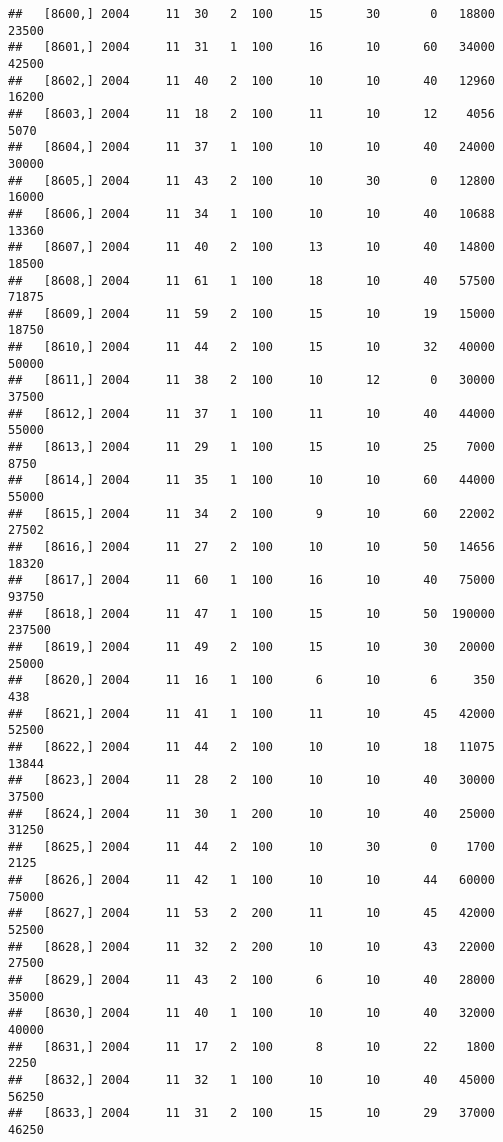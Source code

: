 \documentclass{article}\usepackage[]{graphicx}\usepackage[]{color}
\makeatletter
\newenvironment{kframe}{%
 \def\at@end@of@kframe{}%
 \ifinner\ifhmode%
  \def\at@end@of@kframe{\end{minipage}}%
  \begin{minipage}{\columnwidth}%
 \fi\fi%
 \def\FrameCommand##1{\hskip\@totalleftmargin \hskip-\fboxsep
 \colorbox{shadecolor}{##1}\hskip-\fboxsep
     \hskip-\linewidth \hskip-\@totalleftmargin \hskip\columnwidth}%
 \MakeFramed {\advance\hsize-\width
   \@totalleftmargin\z@ \linewidth\hsize
   \@setminipage}}%
 {\par\unskip\endMakeFramed%
 \at@end@of@kframe}
\newenvironment{knitrout}{}{} %
\makeatother
\begin{document}
\begin{knitrout}
\begin{kframe}
\begin{verbatim}
##   [8600,] 2004     11  30   2  100     15      30       0   18800   23500
##   [8601,] 2004     11  31   1  100     16      10      60   34000   42500
##   [8602,] 2004     11  40   2  100     10      10      40   12960   16200
##   [8603,] 2004     11  18   2  100     11      10      12    4056    5070
##   [8604,] 2004     11  37   1  100     10      10      40   24000   30000
##   [8605,] 2004     11  43   2  100     10      30       0   12800   16000
##   [8606,] 2004     11  34   1  100     10      10      40   10688   13360
##   [8607,] 2004     11  40   2  100     13      10      40   14800   18500
##   [8608,] 2004     11  61   1  100     18      10      40   57500   71875
##   [8609,] 2004     11  59   2  100     15      10      19   15000   18750
##   [8610,] 2004     11  44   2  100     15      10      32   40000   50000
##   [8611,] 2004     11  38   2  100     10      12       0   30000   37500
##   [8612,] 2004     11  37   1  100     11      10      40   44000   55000
##   [8613,] 2004     11  29   1  100     15      10      25    7000    8750
##   [8614,] 2004     11  35   1  100     10      10      60   44000   55000
##   [8615,] 2004     11  34   2  100      9      10      60   22002   27502
##   [8616,] 2004     11  27   2  100     10      10      50   14656   18320
##   [8617,] 2004     11  60   1  100     16      10      40   75000   93750
##   [8618,] 2004     11  47   1  100     15      10      50  190000  237500
##   [8619,] 2004     11  49   2  100     15      10      30   20000   25000
##   [8620,] 2004     11  16   1  100      6      10       6     350     438
##   [8621,] 2004     11  41   1  100     11      10      45   42000   52500
##   [8622,] 2004     11  44   2  100     10      10      18   11075   13844
##   [8623,] 2004     11  28   2  100     10      10      40   30000   37500
##   [8624,] 2004     11  30   1  200     10      10      40   25000   31250
##   [8625,] 2004     11  44   2  100     10      30       0    1700    2125
##   [8626,] 2004     11  42   1  100     10      10      44   60000   75000
##   [8627,] 2004     11  53   2  200     11      10      45   42000   52500
##   [8628,] 2004     11  32   2  200     10      10      43   22000   27500
##   [8629,] 2004     11  43   2  100      6      10      40   28000   35000
##   [8630,] 2004     11  40   1  100     10      10      40   32000   40000
##   [8631,] 2004     11  17   2  100      8      10      22    1800    2250
##   [8632,] 2004     11  32   1  100     10      10      40   45000   56250
##   [8633,] 2004     11  31   2  100     15      10      29   37000   46250

\end{verbatim}
\end{kframe}
\end{knitrout}
\end{document}

